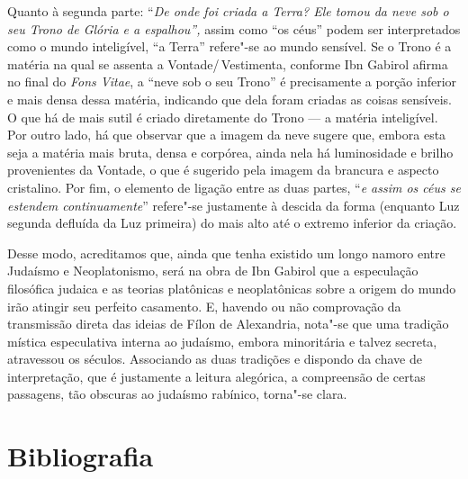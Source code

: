 Quanto à segunda parte: “\emph{De onde foi criada a Terra? Ele
tomou
da neve sob o seu Trono de Glória e a espalhou”,} assim como “os
céus” podem ser interpretados como o mundo inteligível, “a Terra”
refere"-se ao mundo sensível. Se o Trono é a matéria na qual se
assenta a Vontade/\,Vestimenta, conforme Ibn Gabirol afirma no final
do
\emph{Fons Vitae}, a “neve sob o seu Trono” é precisamente a
porção
inferior e mais densa dessa matéria, indicando que dela foram
criadas
as coisas sensíveis. O que há de mais sutil é criado diretamente do
Trono --- a matéria inteligível. Por outro lado, há que observar que a
imagem da neve sugere que, embora esta seja a matéria mais bruta,
densa e corpórea, ainda nela há luminosidade e brilho provenientes
da
Vontade, o que é sugerido pela imagem da brancura e aspecto
cristalino. Por fim, o elemento de ligação entre as duas partes,
“\emph{e assim os céus se estendem continuamente}” refere"-se
justamente à descida da forma (enquanto Luz segunda defluída da Luz
primeira) do mais alto até o extremo inferior da criação.

Desse modo, acreditamos que, ainda que tenha existido um longo
namoro
entre Judaísmo e Neoplatonismo, será na obra de Ibn Gabirol que a
especulação filosófica judaica e as teorias platônicas e
neoplatônicas sobre a origem do mundo irão atingir seu perfeito
casamento. E, havendo ou não comprovação da transmissão direta das
ideias de Fílon de Alexandria, nota"-se que uma tradição mística
especulativa interna ao judaísmo, embora minoritária e talvez
secreta, atravessou os séculos. Associando as duas tradições e
dispondo da chave de interpretação, que é justamente a leitura
alegórica, a compreensão de certas passagens, tão obscuras ao
judaísmo rabínico, torna"-se clara.

\section{Bibliografia}

